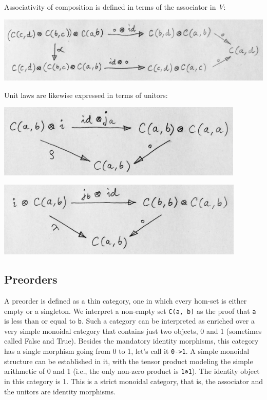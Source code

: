 Associativity of composition is defined in terms of the associator in
\emph{V}:

\includegraphics[width=5.35417in]{images/compcoherence.jpg}

Unit laws are likewise expressed in terms of unitors:

\includegraphics[width=4.64583in]{images/rightid.jpg}

\includegraphics[width=4.65625in]{images/leftid.jpg}

\subsection{Preorders}\label{preorders}

A preorder is defined as a thin category, one in which every hom-set is
either empty or a singleton. We interpret a non-empty set
\texttt{C(a,\ b)} as the proof that \texttt{a} is less than or equal to
\texttt{b}. Such a category can be interpreted as enriched over a very
simple monoidal category that contains just two objects, 0 and 1
(sometimes called False and True). Besides the mandatory identity
morphisms, this category has a single morphism going from 0 to 1, let's
call it \texttt{0-\textgreater{}1}. A simple monoidal structure can be
established in it, with the tensor product modeling the simple
arithmetic of 0 and 1 (i.e., the only non-zero product is \texttt{1⊗1}).
The identity object in this category is 1. This is a strict monoidal
category, that is, the associator and the unitors are identity
morphisms.

